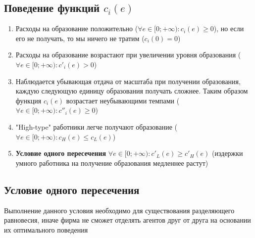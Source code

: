 \subsection{Поведение функций $c_i(e)$}
\begin{enumerate}
    \item Расходы на образование положительно ($\forall e\in [0;+\infty) : c_i(e)\geq0$), но если его не получать, то мы ничего не тратим ($c_i(0)=0$)
    \item Расходы на образование возрастают при увеличении уровня образования ($\forall e\in [0;+\infty) : c'_i(e)>0$)
    \item Наблюдается убывающая отдача от масштаба при получении образования, каждую следующую единицу образования
    получать сложнее. Таким образом функция $c_i(e)$ возрастает неубывающими темпами ($\forall e\in [0;+\infty) : c''_i(e)\geq0$)
    \item "High-type" работники легче получают образование ($\forall e\in [0;+\infty) : c_H(e)\leq c_L(e)$)
    \item \textbf{Условие одного пересечения} $\forall e\in [0;+\infty) : c'_L(e)\geq c'_H(e)$ (издержки умного
    работника на получение образования медленнее растут)
\end{enumerate}

\subsection{Условие одного пересечения}
\indent\setlength{\parindent}{1em}Выполнение данного условия необходимо для существования разделяющего равновесия, иначе фирма не сможет отделять агентов друг от друга на основании их оптимального поведения
\smallskip
\begin{center}
\end{center}

